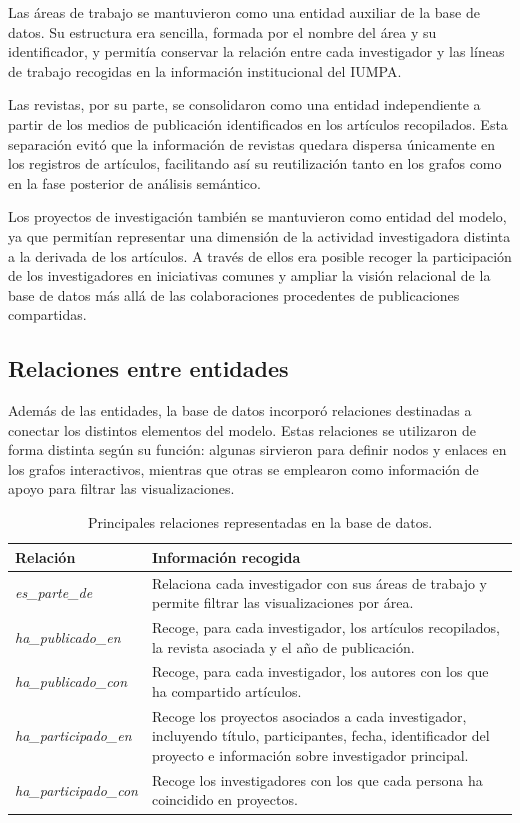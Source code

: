 \documentclass[11pt,spanish,listoffigures,listoftables]{tfgetsinf}
\begin{document}
Las áreas de trabajo se mantuvieron como una entidad auxiliar de la base de datos. Su estructura era sencilla, formada por el nombre del área y su identificador, y permitía conservar la relación entre cada investigador y las líneas de trabajo recogidas en la información institucional del IUMPA.

Las revistas, por su parte, se consolidaron como una entidad independiente a partir de los medios de publicación identificados en los artículos recopilados. Esta separación evitó que la información de revistas quedara dispersa únicamente en los registros de artículos, facilitando así su reutilización tanto en los grafos como en la fase posterior de análisis semántico.

Los proyectos de investigación también se mantuvieron como entidad del modelo, ya que permitían representar una dimensión de la actividad investigadora distinta a la derivada de los artículos. A través de ellos era posible recoger la participación de los investigadores en iniciativas comunes y ampliar la visión relacional de la base de datos más allá de las colaboraciones procedentes de publicaciones compartidas.

\subsection{Relaciones entre entidades}

Además de las entidades, la base de datos incorporó relaciones destinadas a conectar los distintos elementos del modelo. Estas relaciones se utilizaron de forma distinta según su función: algunas sirvieron para definir nodos y enlaces en los grafos interactivos, mientras que otras se emplearon como información de apoyo para filtrar las visualizaciones.

\begin{table}[H]
\centering
\small
\renewcommand{\arraystretch}{1.25}
\begin{tabularx}{\textwidth}{
>{\raggedright\arraybackslash}p{4cm}
>{\raggedright\arraybackslash}X
}
\toprule
\textbf{Relación} & \textbf{Información recogida} \\
\midrule
\textit{es\_parte\_de} 
& Relaciona cada investigador con sus áreas de trabajo y permite filtrar las visualizaciones por área. \\
\midrule
\textit{ha\_publicado\_en} 
& Recoge, para cada investigador, los artículos recopilados, la revista asociada y el año de publicación. \\
\midrule
\textit{ha\_publicado\_con} 
& Recoge, para cada investigador, los autores con los que ha compartido artículos. \\
\midrule
\textit{ha\_participado\_en} 
& Recoge los proyectos asociados a cada investigador, incluyendo título, participantes, fecha, identificador del proyecto e información sobre investigador principal. \\
\midrule
\textit{ha\_participado\_con} 
& Recoge los investigadores con los que cada persona ha coincidido en proyectos. \\
\bottomrule
\end{tabularx}
\caption{Principales relaciones representadas en la base de datos.}
\end{table}
\end{document}
